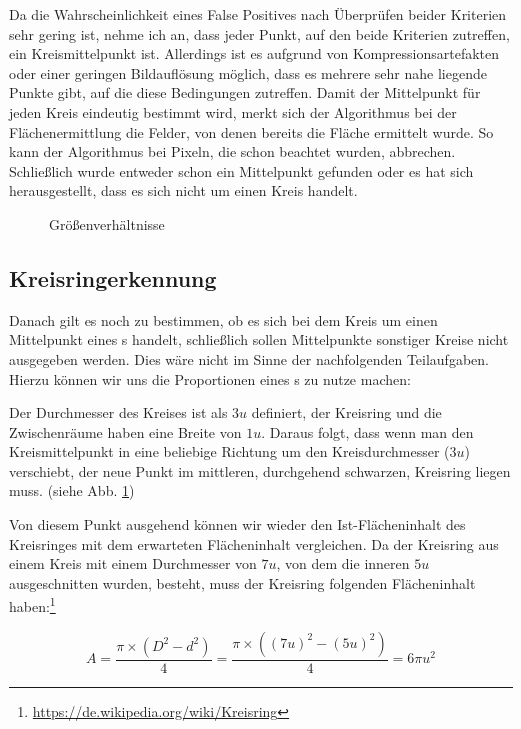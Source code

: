 Da die Wahrscheinlichkeit eines False Positives nach Überprüfen beider Kriterien sehr gering ist, nehme ich an, dass jeder Punkt, auf den beide Kriterien zutreffen, ein Kreismittelpunkt ist. 
Allerdings ist es aufgrund von Kompressionsartefakten oder einer geringen Bildauflösung möglich, dass es mehrere sehr nahe liegende Punkte gibt, auf die diese Bedingungen zutreffen. Damit der Mittelpunkt für jeden Kreis eindeutig bestimmt wird, merkt sich der Algorithmus bei der Flächenermittlung die Felder, von denen bereits die Fläche ermittelt wurde. 
So kann der Algorithmus bei Pixeln, die schon beachtet wurden, abbrechen. Schließlich wurde entweder schon ein Mittelpunkt gefunden oder es hat sich herausgestellt, dass es sich nicht um einen Kreis handelt.

\begin{figure}
  \centering
  
  \caption{Größenverhältnisse}
  \label{abb:dims}
\end{figure}

\subsection{Kreisringerkennung}
Danach gilt es noch zu bestimmen, ob es sich bei dem Kreis um einen Mittelpunkt eines \task{}s handelt, schließlich sollen Mittelpunkte sonstiger Kreise nicht ausgegeben werden. Dies wäre nicht im Sinne der nachfolgenden Teilaufgaben. Hierzu können wir uns die Proportionen eines \task{}s zu nutze machen:

Der Durchmesser des Kreises ist als \(3u\) definiert, der Kreisring und die Zwischenräume haben eine Breite von \(1u\). 
Daraus folgt, dass wenn man den Kreismittelpunkt in eine beliebige Richtung um den Kreisdurchmesser (\(3u\)) verschiebt, der neue Punkt im mittleren, durchgehend schwarzen, Kreisring liegen muss. (siehe Abb. \ref{abb:dims})

Von diesem Punkt ausgehend können wir wieder den Ist-Flächeninhalt des Kreisringes mit dem erwarteten Flächeninhalt vergleichen. Da der Kreisring aus einem Kreis mit einem Durchmesser von \(7u\), von dem die inneren \(5u\) ausgeschnitten wurden, besteht, muss der Kreisring folgenden Flächeninhalt haben:\footnote{\url{https://de.wikipedia.org/wiki/Kreisring}}

\begin{equation}
	A=\frac{\pi{}\times(D^2-d^2)}{4}=\frac{\pi{}\times((7u)^2-(5u)^2)}{4}=6\pi{}u^2
\end{equation}

